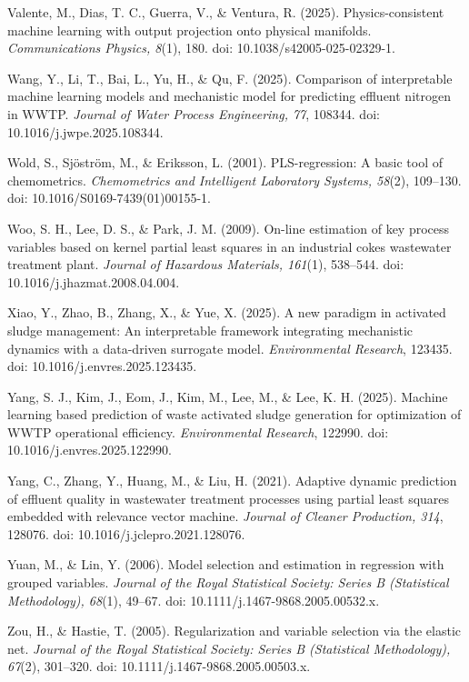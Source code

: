 \documentclass[a4paper,fleqn]{cas-sc}
\begin{document}
\noindent Valente, M., Dias, T. C., Guerra, V., \& Ventura, R. (2025). Physics-consistent machine learning with output projection onto physical manifolds. \textit{Communications Physics, 8}(1), 180. doi: 10.1038/s42005-025-02329-1.

\noindent Wang, Y., Li, T., Bai, L., Yu, H., \& Qu, F. (2025). Comparison of interpretable machine learning models and mechanistic model for predicting effluent nitrogen in WWTP. \textit{Journal of Water Process Engineering, 77}, 108344. doi: 10.1016/j.jwpe.2025.108344.

\noindent Wold, S., Sj\"ostr\"om, M., \& Eriksson, L. (2001). PLS-regression: A basic tool of chemometrics. \textit{Chemometrics and Intelligent Laboratory Systems, 58}(2), 109--130. doi: 10.1016/S0169-7439(01)00155-1.

\noindent Woo, S. H., Lee, D. S., \& Park, J. M. (2009). On-line estimation of key process variables based on kernel partial least squares in an industrial cokes wastewater treatment plant. \textit{Journal of Hazardous Materials, 161}(1), 538--544. doi: 10.1016/j.jhazmat.2008.04.004.

\noindent Xiao, Y., Zhao, B., Zhang, X., \& Yue, X. (2025). A new paradigm in activated sludge management: An interpretable framework integrating mechanistic dynamics with a data-driven surrogate model. \textit{Environmental Research}, 123435. doi: 10.1016/j.envres.2025.123435.

\noindent Yang, S. J., Kim, J., Eom, J., Kim, M., Lee, M., \& Lee, K. H. (2025). Machine learning based prediction of waste activated sludge generation for optimization of WWTP operational efficiency. \textit{Environmental Research}, 122990. doi: 10.1016/j.envres.2025.122990.

\noindent Yang, C., Zhang, Y., Huang, M., \& Liu, H. (2021). Adaptive dynamic prediction of effluent quality in wastewater treatment processes using partial least squares embedded with relevance vector machine. \textit{Journal of Cleaner Production, 314}, 128076. doi: 10.1016/j.jclepro.2021.128076.

\noindent Yuan, M., \& Lin, Y. (2006). Model selection and estimation in regression with grouped variables. \textit{Journal of the Royal Statistical Society: Series B (Statistical Methodology), 68}(1), 49--67. doi: 10.1111/j.1467-9868.2005.00532.x.

\noindent Zou, H., \& Hastie, T. (2005). Regularization and variable selection via the elastic net. \textit{Journal of the Royal Statistical Society: Series B (Statistical Methodology), 67}(2), 301--320. doi: 10.1111/j.1467-9868.2005.00503.x.
\end{document}

